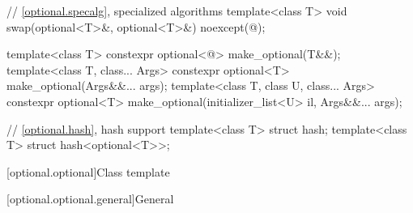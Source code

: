\begin{codeblock}
{  // \ref{optional.specalg}, specialized algorithms
  template<class T>
    void swap(optional<T>&, optional<T>&) noexcept(@\seebelow@);

  template<class T>
    constexpr optional<@\seebelow@> make_optional(T&&);
  template<class T, class... Args>
    constexpr optional<T> make_optional(Args&&... args);
  template<class T, class U, class... Args>
    constexpr optional<T> make_optional(initializer_list<U> il, Args&&... args);

  // \ref{optional.hash}, hash support
  template<class T> struct hash;
  template<class T> struct hash<optional<T>>;
}
\end{codeblock}

[optional.optional]{Class template }

[optional.optional.general]{General}


